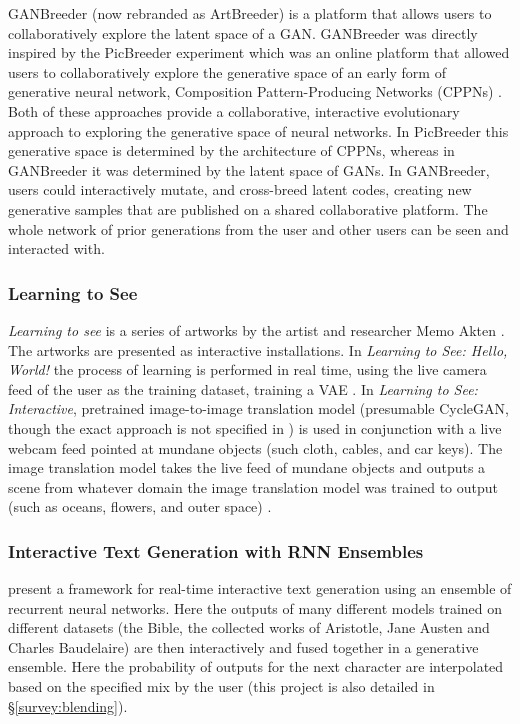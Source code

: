 GANBreeder (now rebranded as ArtBreeder) \citep{simon2020artbreeder} is a platform that allows users to collaboratively explore the latent space of a GAN.
GANBreeder was directly inspired by the PicBreeder experiment \citep{secretan2008picbreeder,secretan2011picbreeder} which was an online platform that allowed users to collaboratively explore the generative space of an early form of generative neural network, Composition Pattern-Producing Networks (CPPNs) \citep{stanley2007compositional}.
Both of these approaches provide a collaborative, interactive evolutionary approach to exploring the generative space of neural networks. 
In PicBreeder this generative space is determined by the architecture of CPPNs, whereas in GANBreeder it was determined by the latent space of GANs.
In GANBreeder, users could interactively mutate, and cross-breed latent codes, creating new generative samples that are published on a shared collaborative platform.
The whole network of prior generations from the user and other users can be seen and interacted with.

\subsubsection{Learning to See}

\textit{Learning to see} is a series of artworks by the artist and researcher Memo Akten \citep{akten2019learning, celis2021memo}.
The artworks are presented as interactive installations.
In \textit{Learning to See: Hello, World!} the process of learning is performed in real time, using the live camera feed of the user as the training dataset, training a VAE \citep{akten2017hello}.
In \textit{Learning to See: Interactive}, pretrained image-to-image translation model (presumable CycleGAN, though the exact approach is not specified in \citep{akten2019learning}) is used in conjunction with a live webcam feed pointed at mundane objects (such cloth, cables, and car keys).
The image translation model takes the live feed of mundane objects and outputs a scene from whatever domain the image translation model was trained to output (such as oceans, flowers, and outer space) \citep{akten2017interactive}.

\subsubsection{Interactive Text Generation with RNN Ensembles}

\cite{akten2016real} present a framework for real-time interactive text generation using an ensemble of recurrent neural networks. 
Here the outputs of many different models trained on different datasets (the Bible, the collected works of Aristotle, Jane Austen and Charles Baudelaire) are then interactively and fused together in a generative ensemble.
Here the probability of outputs for the next character are interpolated based on the specified mix by the user (this project is also detailed in \S \ref{survey:blending}).

